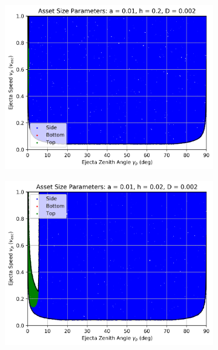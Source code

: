 \documentclass{article}
\begin{document}
\begin{figure}
	\begin{subfigure}[t]{.32\textwidth}
		\centering
		\includegraphics[width=.95\linewidth]{asset_speed_zenith_plot_1.000e-02_2.000e-01_2.000e-03.png}  
		\label{fig:sub-asset_speed_zenith_1}
	\end{subfigure}
	\begin{subfigure}[t]{.32\textwidth}
		\centering
		\includegraphics[width=.95\linewidth]{asset_speed_zenith_plot_1.000e-02_2.000e-02_2.000e-03.png}  

\end{subfigure}
\end{figure}
\end{document}
